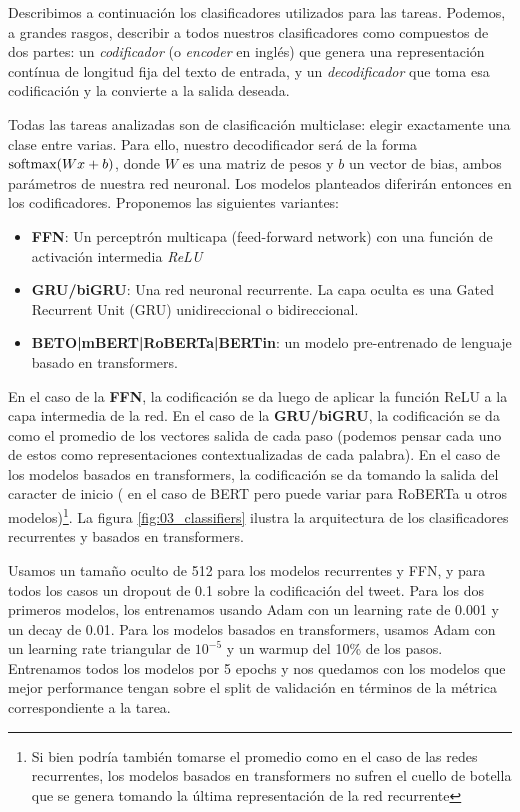 Describimos a continuación los clasificadores utilizados para las tareas. Podemos, a grandes rasgos, describir a todos nuestros clasificadores como compuestos de dos partes: un \emph{codificador} (o \emph{encoder} en inglés) que genera una representación contínua de longitud fija del texto de entrada, y un \emph{decodificador} que toma esa codificación y la convierte a la salida deseada.

Todas las tareas analizadas son de clasificación multiclase: elegir exactamente una clase entre varias. Para ello, nuestro decodificador será de la forma $\text{softmax}(Wx + b)$, donde $W$ es una matriz de pesos y $b$ un vector de bias, ambos parámetros de nuestra red neuronal. Los modelos planteados diferirán entonces en los codificadores. Proponemos las siguientes variantes:

\begin{itemize}
    \item \textbf{FFN}: Un perceptrón multicapa (feed-forward network) con una función de activación intermedia \emph{ReLU}
    \item \textbf{GRU/biGRU}: Una red neuronal recurrente. La capa oculta es una Gated Recurrent Unit (GRU) unidireccional o bidireccional.
    \item \textbf{BETO|mBERT|RoBERTa|BERTin}: un modelo pre-entrenado de lenguaje basado en transformers.
\end{itemize}

En el caso de la \textbf{FFN}, la codificación se da luego de aplicar la función ReLU a la capa intermedia de la red. En el caso de la \textbf{GRU/biGRU}, la codificación se da como el promedio de los vectores salida de cada paso (podemos pensar cada uno de estos como representaciones contextualizadas de cada palabra). En el caso de los modelos basados en transformers, la codificación se da tomando la salida del caracter de inicio (\clstok{} en el caso de BERT pero puede variar para RoBERTa u otros modelos)\footnote{Si bien podría también tomarse el promedio como en el caso de las redes recurrentes, los modelos basados en transformers no sufren el cuello de botella que se genera tomando la última representación de la red recurrente}. La figura \ref{fig:03_classifiers} ilustra la arquitectura de los clasificadores recurrentes y basados en transformers.

Usamos un tamaño oculto de 512 para los modelos recurrentes y FFN, y para todos los casos un dropout \cite{srivastava2014dropout} de 0.1 sobre la codificación del tweet. Para los dos primeros modelos, los entrenamos usando Adam \cite{kingma2014adam} con un learning rate de 0.001 y un decay de 0.01. Para los modelos basados en transformers, usamos Adam con un learning rate triangular de $10^{-5}$ y un warmup del 10\% de los pasos. Entrenamos todos los modelos por 5 epochs y nos quedamos con los modelos que mejor performance tengan sobre el split de validación en términos de la métrica correspondiente a la tarea.

